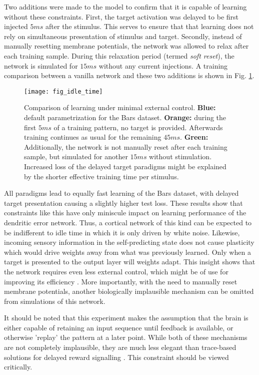 Two additions were made to the model to confirm that it is capable of learning without these constraints. First, the
target activation was delayed to be first injected $5ms$ after the stimulus. This serves to ensure that  that learning
does not rely on simultaneous presentation of stimulus and target. Secondly, instead of manually resetting membrane
potentials, the network was allowed to relax after each training sample. During this relaxation period  (termed
\textit{soft reset}), the network is simulated for $15ms$ without any current injections. A training comparison between
a vanilla network and these two additions is shown in Fig. \ref{fig-idle-time}.


\begin{figure}[h]
    \centering
    \texttt{[image: fig\_idle\_time]}
    \caption[Comparison of learning under minimal external control]{Comparison of learning under minimal external
        control. \textbf{Blue:} default parametrization for the Bars dataset. \textbf{Orange:} during the first $5ms$ of
        a training pattern, no target is provided. Afterwards training continues as usual for the remaining $45ms$.
        \textbf{Green:} Additionally, the network is not manually reset after each training sample, but simulated for
        another $15ms$ without stimulation. Increased loss of the delayed target paradigms might be explained by the
        shorter effective training time per stimulus.}
    \label{fig-idle-time}
\end{figure}

All paradigms lead to equally fast learning of the Bars dataset, with delayed target presentation causing a slightly
higher test loss. These results show that constraints like this have only miniscule impact on learning performance of
the dendritic error network. Thus, a cortical network of this kind can be expected to be indifferent to idle time in
which it is only driven by white noise. Likewise, incoming sensory information in the self-predicting state does not
cause plasticity which would drive weights away from what was previously learned. Only when a target is presented to the
output layer will weights adapt. This insight shows that the network requires even less external control, which might be
of use for improving its efficiency . More importantly, with the need to manually reset membrane
potentials, another biologically implausible mechanism can be omitted from simulations of this network.

It should be noted that this experiment makes the assumption that the brain is either capable of retaining an input
sequence until feedback is available, or otherwise 'replay' the pattern at a later point. While both of these mechanisms
are not completely implausible, they are much less elegant than trace-based solutions for delayed reward signalling
\citep{bellec2020solution}. This constraint should be viewed critically.